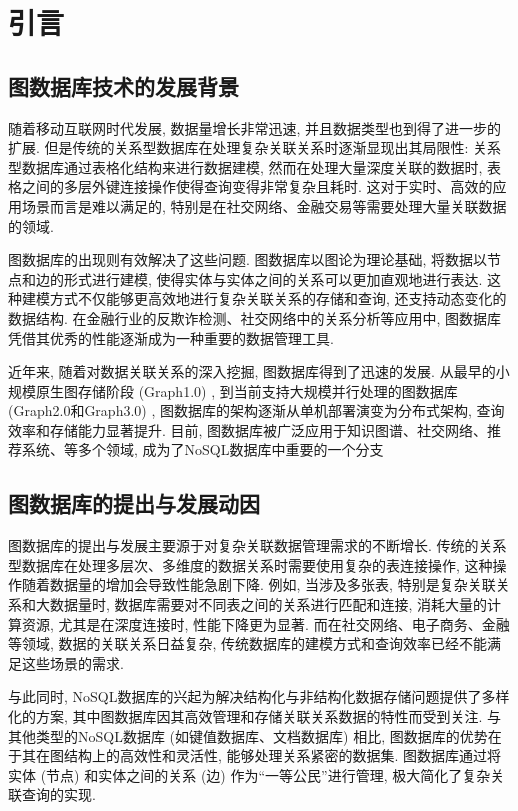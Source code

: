 \section{引言}

\subsection{图数据库技术的发展背景}

随着移动互联网时代发展, 数据量增长非常迅速, 并且数据类型也到得了进一步的扩展. 但是传统的关系型数据库在处理复杂关联关系时逐渐显现出其局限性: 关系型数据库通过表格化结构来进行数据建模, 然而在处理大量深度关联的数据时, 表格之间的多层外键连接操作使得查询变得非常复杂且耗时. 这对于实时、高效的应用场景而言是难以满足的, 特别是在社交网络、金融交易等需要处理大量关联数据的领域.

图数据库的出现则有效解决了这些问题. 图数据库以图论为理论基础, 将数据以节点和边的形式进行建模, 使得实体与实体之间的关系可以更加直观地进行表达. 这种建模方式不仅能够更高效地进行复杂关联关系的存储和查询, 还支持动态变化的数据结构. 在金融行业的反欺诈检测、社交网络中的关系分析等应用中, 图数据库凭借其优秀的性能逐渐成为一种重要的数据管理工具.

近年来, 随着对数据关联关系的深入挖掘, 图数据库得到了迅速的发展. 从最早的小规模原生图存储阶段 (Graph1.0) , 到当前支持大规模并行处理的图数据库 (Graph2.0和Graph3.0) , 图数据库的架构逐渐从单机部署演变为分布式架构, 查询效率和存储能力显著提升. 目前, 图数据库被广泛应用于知识图谱、社交网络、推荐系统、等多个领域, 成为了NoSQL数据库中重要的一个分支

\subsection{图数据库的提出与发展动因}

图数据库的提出与发展主要源于对复杂关联数据管理需求的不断增长. 传统的关系型数据库在处理多层次、多维度的数据关系时需要使用复杂的表连接操作, 这种操作随着数据量的增加会导致性能急剧下降. 例如, 当涉及多张表, 特别是复杂关联关系和大数据量时, 数据库需要对不同表之间的关系进行匹配和连接, 消耗大量的计算资源, 尤其是在深度连接时, 性能下降更为显著. 而在社交网络、电子商务、金融等领域, 数据的关联关系日益复杂, 传统数据库的建模方式和查询效率已经不能满足这些场景的需求.

与此同时, NoSQL数据库的兴起为解决结构化与非结构化数据存储问题提供了多样化的方案, 其中图数据库因其高效管理和存储关联关系数据的特性而受到关注. 与其他类型的NoSQL数据库 (如键值数据库、文档数据库) 相比, 图数据库的优势在于其在图结构上的高效性和灵活性, 能够处理关系紧密的数据集. 图数据库通过将实体 (节点) 和实体之间的关系 (边) 作为“一等公民”进行管理, 极大简化了复杂关联查询的实现.

